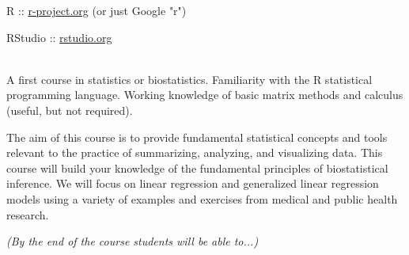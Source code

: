 \documentclass[10pt]{article}
\begin{document}

R :: \href{http://www.r-project.org}{r-project.org} (or just Google "r")

RStudio :: \href{http://www.rstudio.org}{rstudio.org}


\bigskip
{}\\
A first course in statistics or biostatistics. Familiarity with the R statistical programming language. Working knowledge of basic matrix methods and calculus (useful, but not required). 




\bigskip
{}

 The aim of this course is to provide fundamental statistical concepts and tools relevant to the practice of summarizing, analyzing, and visualizing data. This course will build your knowledge of the fundamental principles of biostatistical inference.  We will focus on linear regression and generalized linear regression models using a variety of examples and exercises from medical and public health research. %


\bigskip
{} {\em (By the end of the course students will be able to...)}
\end{document}
